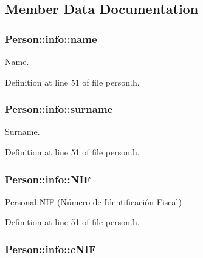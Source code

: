 \subsection{Member Data Documentation}
\hypertarget{struct_person_1_1info_a81051c5b2abdf064395938f2f47017b8}{
\subsubsection[{name}]{\setlength{\rightskip}{0pt plus 5cm}Person\+::info\+::name}}\label{struct_person_1_1info_a81051c5b2abdf064395938f2f47017b8}


Name. 



Definition at line 51 of file person.\+h.

\hypertarget{struct_person_1_1info_a5dffef4c24ab24eaa62a3428e04b4239}{
\subsubsection[{surname}]{\setlength{\rightskip}{0pt plus 5cm}Person\+::info\+::surname}}\label{struct_person_1_1info_a5dffef4c24ab24eaa62a3428e04b4239}


Surname. 



Definition at line 51 of file person.\+h.

\hypertarget{struct_person_1_1info_ab91922388b5ba74969a7d8f7a4fad95b}{
\subsubsection[{N\+I\+F}]{\setlength{\rightskip}{0pt plus 5cm}Person\+::info\+::\+N\+I\+F}}\label{struct_person_1_1info_ab91922388b5ba74969a7d8f7a4fad95b}


Personal N\+I\+F (Número de Identificación Fiscal) 



Definition at line 51 of file person.\+h.

\hypertarget{struct_person_1_1info_a3ee6bcba23c2257f4571084e7a734e6d}{
\subsubsection[{c\+N\+I\+F}]{\setlength{\rightskip}{0pt plus 5cm}Person\+::info\+::c\+N\+I\+F}}\label{struct_person_1_1info_a3ee6bcba23c2257f4571084e7a734e6d}


